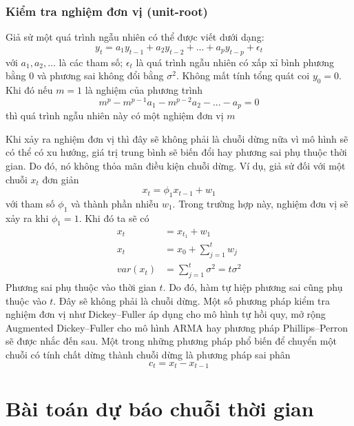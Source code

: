 \subsubsection{Kiểm tra nghiệm đơn vị (unit-root)}
\begin{defi}\label{unit_root}
Giả sử một quá trình ngẫu nhiên có thể được viết dưới dạng:
\begin{equation}
	y_t = a_1y_{t-1}+a_2y_{t-2}+...+a_py_{t-p}+\epsilon_t
\end{equation}
	với $a_1,a_2,\dots$ là các tham số; $\epsilon_t$ là quá trình ngẫu nhiên có xấp xỉ bình phương bằng 0 và phương sai không đổi bằng $\sigma^{2}$. Không mất tính tổng quát coi $y_0 = 0$.
	Khi đó nếu $m=1$ là nghiệm của phương trình 
	\begin{equation}
		m^p - m^{p-1}a_1 - m^{p-2}a_2 - ... - a_p = 0 
	\end{equation}
	thì quá trình ngẫu nhiên này có một nghiệm đơn vị $m$
\end{defi}
Khi xảy ra nghiệm đơn vị thì đây sẽ không phải là chuỗi dừng nữa vì mô hình sẽ có thể có xu hướng, giá trị trung bình sẽ biến đổi hay phương sai phụ thuộc thời gian. Do đó, nó không thỏa mãn điều kiện chuỗi dừng. Ví dụ, giả sử đối với một chuỗi $x_t$ đơn giản
\begin{equation}
	x_t = \phi_1x_{t-1}+w_1
\end{equation}
với tham số $\phi_1$ và thành phần nhiễu $w_1$. Trong trường hợp này, nghiệm đơn vị sẽ xảy ra khi $\phi_1=1$.
Khi đó ta sẽ có 
	\begin{align}
		x_t&= x_{t_1}+w_1 \\
		x_t&=x_0+\sum\limits_{j=1}^{t}w_j\\
		var(x_t) &= \sum\limits_{j=1}^{t}\sigma^2 = t\sigma^2
	\end{align}
	Phương sai phụ thuộc vào thời gian $t$. Do đó, hàm tự hiệp phương sai cũng phụ thuộc vào $t$. Đây sẽ không phải là chuỗi dừng.
Một số phương pháp kiểm tra nghiệm đơn vị như Dickey–Fuller \citep{df79} áp dụng cho mô hình tự hồi quy, mở rộng Augmented Dickey–Fuller \citep{ell96} cho mô hình ARMA hay phương pháp Phillips–Perron \citep{ff88} sẽ được nhắc đến sau.
Một trong những phương pháp phổ biến để chuyển một chuỗi có tính chất dừng thành chuỗi dừng là phương pháp sai phân
\begin{equation}
	c_t = x_{t} - x_{t-1}
\end{equation}

\section{Bài toán dự báo chuỗi thời gian}
